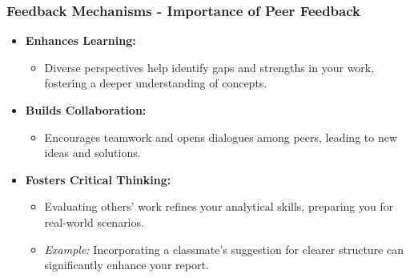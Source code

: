 \documentclass[aspectratio=169]{beamer}
\begin{document}
\begin{frame}[fragile]
    \frametitle{Feedback Mechanisms - Importance of Peer Feedback}
    
    \begin{itemize}
        \item \textbf{Enhances Learning:} 
            \begin{itemize}
                \item Diverse perspectives help identify gaps and strengths in your work, fostering a deeper understanding of concepts.
            \end{itemize}
        \item \textbf{Builds Collaboration:} 
            \begin{itemize}
                \item Encourages teamwork and opens dialogues among peers, leading to new ideas and solutions.
            \end{itemize}
        \item \textbf{Fosters Critical Thinking:} 
            \begin{itemize}
                \item Evaluating others' work refines your analytical skills, preparing you for real-world scenarios.
                \item \textit{Example:} Incorporating a classmate's suggestion for clearer structure can significantly enhance your report.
            \end{itemize}
    \end{itemize}
\end{frame}
\end{document}
